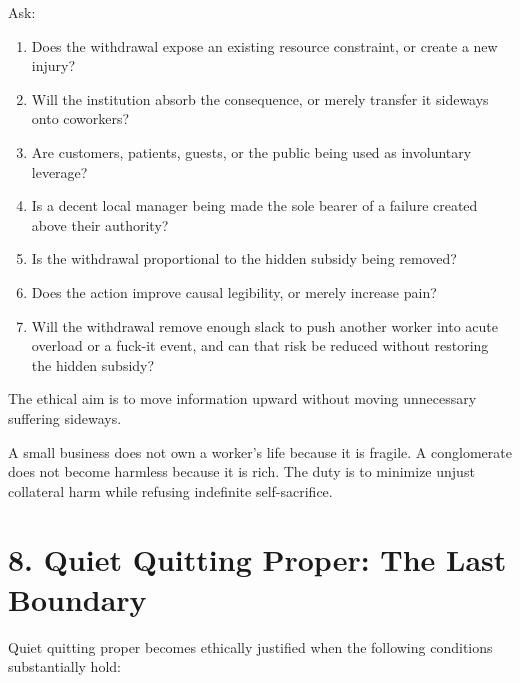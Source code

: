 \documentclass[11pt,oneside]{article}
\providecommand{\tightlist}{%
  \setlength{\itemsep}{0.22em}\setlength{\parskip}{0pt}}
\begin{document}
Ask:

\begin{enumerate}
\def\labelenumi{\arabic{enumi}.}
\tightlist
\item
  Does the withdrawal expose an existing resource constraint, or create
  a new injury?
\item
  Will the institution absorb the consequence, or merely transfer it
  sideways onto coworkers?
\item
  Are customers, patients, guests, or the public being used as
  involuntary leverage?
\item
  Is a decent local manager being made the sole bearer of a failure
  created above their authority?
\item
  Is the withdrawal proportional to the hidden subsidy being removed?
\item
  Does the action improve causal legibility, or merely increase pain?
\item
  Will the withdrawal remove enough slack to push another worker into
  acute overload or a fuck-it event, and can that risk be reduced
  without restoring the hidden subsidy?
\end{enumerate}

The ethical aim is to move information upward without moving unnecessary
suffering sideways.

A small business does not own a worker's life because it is fragile. A
conglomerate does not become harmless because it is rich. The duty is to
minimize unjust collateral harm while refusing indefinite
self-sacrifice.

\section{8. Quiet Quitting Proper: The Last
Boundary}\label{quiet-quitting-proper-the-last-boundary}

Quiet quitting proper becomes ethically justified when the following
conditions substantially hold:
\end{document}
